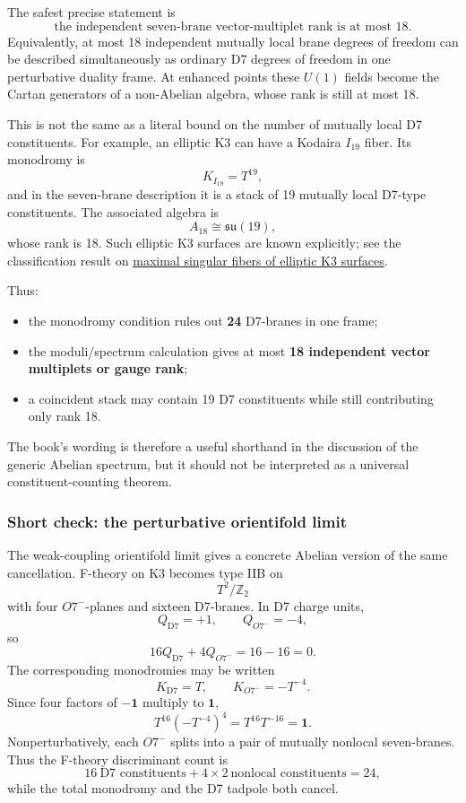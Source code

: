 \documentclass[
  10pt,
  a4paper,
  openany]{book}
\providecommand{\tightlist}{%
  \setlength{\itemsep}{0pt}\setlength{\parskip}{0pt}}
\begin{document}
The safest precise statement is \[
\boxed{
\text{the independent seven-brane vector-multiplet rank is at most }18
}.
\] Equivalently, at most 18 independent mutually local brane degrees of
freedom can be described simultaneously as ordinary D7 degrees of
freedom in one perturbative duality frame. At enhanced points these
\(U(1)\) fields become the Cartan generators of a non-Abelian algebra,
whose rank is still at most 18.

This is not the same as a literal bound on the number of mutually local
D7 constituents. For example, an elliptic K3 can have a Kodaira
\(I_{19}\) fiber. Its monodromy is \[
K_{I_{19}}=T^{19},
\] and in the seven-brane description it is a stack of 19 mutually local
D7-type constituents. The associated algebra is \[
A_{18}\cong\mathfrak{su}(19),
\] whose rank is 18. Such elliptic K3 surfaces are known explicitly; see
the classification result on
\href{https://arxiv.org/abs/math/0509540}{maximal singular fibers of
elliptic K3 surfaces}.

Thus:

\begin{itemize}
\tightlist
\item
  the monodromy condition rules out \textbf{24} D7-branes in one frame;
\item
  the moduli/spectrum calculation gives at most \textbf{18 independent
  vector multiplets or gauge rank};
\item
  a coincident stack may contain 19 D7 constituents while still
  contributing only rank 18.
\end{itemize}

The book's wording is therefore a useful shorthand in the discussion of
the generic Abelian spectrum, but it should not be interpreted as a
universal constituent-counting theorem.

\subsubsection{Short check: the perturbative orientifold
limit}\label{short-check-the-perturbative-orientifold-limit}

The weak-coupling orientifold limit gives a concrete Abelian version of
the same cancellation. F-theory on K3 becomes type IIB on \[
T^2/\mathbb Z_2
\] with four \(O7^-\)-planes and sixteen D7-branes. In D7 charge units,
\[
Q_{\mathrm{D7}}=+1,
\qquad
Q_{O7^-}=-4,
\] so \[
16Q_{\mathrm{D7}}+4Q_{O7^-}
=16-16
=0.
\] The corresponding monodromies may be written \[
K_{\mathrm{D7}}=T,
\qquad
K_{O7^-}=-T^{-4}.
\] Since four factors of \(-\mathbf1\) multiply to \(\mathbf1\), \[
T^{16}(-T^{-4})^4
=T^{16}T^{-16}
=\mathbf1.
\] Nonperturbatively, each \(O7^-\) splits into a pair of mutually
nonlocal seven-branes. Thus the F-theory discriminant count is \[
16\ \text{D7 constituents}
+4\times2\ \text{nonlocal constituents}
=24,
\] while the total monodromy and the D7 tadpole both cancel.
\end{document}
